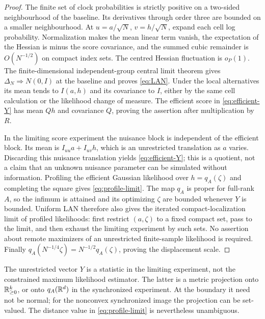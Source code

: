 \begin{proof}
The finite set of clock probabilities is strictly positive on a two-sided neighbourhood of the baseline. Its derivatives through order three are bounded on a smaller neighbourhood. At $u=a/\sqrt N$, $v=h/\sqrt N$, expand each cell log probability. Normalization makes the mean linear term vanish, the expectation of the Hessian is minus the score covariance, and the summed cubic remainder is $O(N^{-1/2})$ on compact index sets. The centred Hessian fluctuation is $o_P(1)$. The finite-dimensional independent-group central limit theorem gives $\Delta_N\Rightarrow N(0,I)$ at the baseline and proves \eqref{eq:LAN}. Under the local alternatives its mean tends to $I(a,h)$ and its covariance to $I$, either by the same cell calculation or the likelihood change of measure. The efficient score in \eqref{eq:efficient-Y} has mean $Qh$ and covariance $Q$, proving the assertion after multiplication by $R$.

In the limiting score experiment the nuisance block is independent of the efficient block. Its mean is $I_{uu}a+I_{uv}h$, which is an unrestricted translation as $a$ varies. Discarding this nuisance translation yields \eqref{eq:efficient-Y}; this is a quotient, not a claim that an unknown nuisance parameter can be simulated without information. Profiling the efficient Gaussian likelihood over $h=q_A(\zeta)$ and completing the square gives \eqref{eq:profile-limit}. The map $q_A$ is proper for full-rank $A$, so the infimum is attained and its optimizing $\zeta$ are bounded whenever $Y$ is bounded. Uniform LAN therefore also gives the iterated compact-localization limit of profiled likelihoods: first restrict $(a,\zeta)$ to a fixed compact set, pass to the limit, and then exhaust the limiting experiment by such sets. No assertion about remote maximizers of an unrestricted finite-sample likelihood is required. Finally $q_A(N^{-1/4}\zeta)=N^{-1/2}q_A(\zeta)$, proving the displacement scale.
\end{proof}
The unrestricted vector $Y$ is a statistic in the limiting experiment, not the constrained maximum likelihood estimator. The latter is a metric projection onto $\mathbb R^k_{\ge0}$, or onto $q_A(\mathbb R^d)$ in the synchronized experiment. At the boundary it need not be normal; for the nonconvex synchronized image the projection can be set-valued. The distance value in \eqref{eq:profile-limit} is nevertheless unambiguous.

